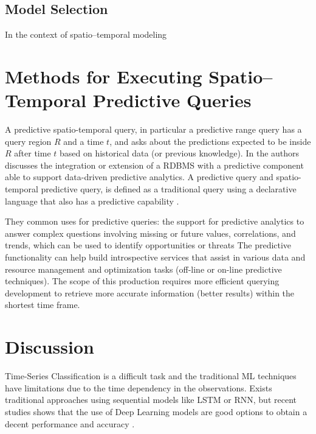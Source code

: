 \subsection{Model Selection}
\label{Sec:STModelSelection}

In the context of spatio--temporal modeling 

\section{Methods for Executing Spatio--Temporal Predictive Queries}
\label{Sec:RelatedWorksQueries}

A predictive spatio-temporal query, in particular a predictive range query has a query region $R$ and a time $t$, and asks about the predictions expected to be inside $R$ after time $t$ based on historical data (or previous knowledge).  In \cite{Akdere2011} the authors discusses the integration or extension of a RDBMS with a predictive component able to support data-driven predictive analytics. A predictive query and spatio-temporal predictive query, is defined as a traditional query using a declarative language that also has a predictive capability \cite{Hendawi2012}. 

They common uses for predictive queries: the support for predictive analytics to answer complex questions involving missing or future values, correlations, and trends, which  can be used to identify opportunities or threats
The predictive functionality can help build introspective services that assist in various data and resource management and optimization tasks (off-line or on-line predictive techniques). 
The  scope  of  this  production requires  more  efficient  querying development to  retrieve more accurate  information (better results)  within  the  shortest time  frame.

\section{Discussion}
Time-Series Classification is a difficult task and the traditional ML techniques have limitations due to the time dependency in the observations. Exists traditional approaches using sequential models like LSTM or RNN, but recent studies shows that the use of Deep Learning models are good options to obtain a decent performance and accuracy \cite{Fawaz2019}. 
